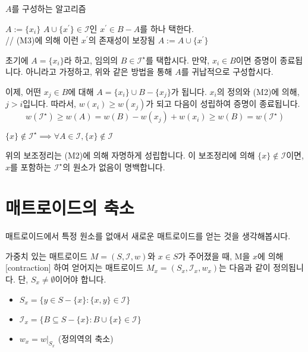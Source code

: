 \documentclass[11pt, a4paper]{book}
\newcommand{\I}{\mathcal{I}}
\begin{document}
    \begin{algorithm}
        \caption{$A$를 구성하는 알고리즘}
        \begin{algorithmic}
            \STATE $A := \{x_i\}$
                \STATE  $A \cup \{x^\prime\} \in \I$인 $x^\prime \in B - A$를 하나 택한다.\\// (M3)에 의해 이런 $x^\prime$의 존재성이 보장됨
                \STATE $A := A \cup \{ x^\prime\}$
            \ENDWHILE
        \end{algorithmic}
    \end{algorithm}
    \begin{MLPrf}
        초기에 $A = \{x_i\}$라 하고, 임의의 $B \in \I^\star$를 택합시다. 만약, $x_i \in B$이면 증명이 종료됩니다. 아니라고 가정하고, 위와 같은 방법을 통해 $A$를 귀납적으로 구성합시다.
        
        이제, 어떤 $x_j \in B$에 대해 $A = \{x_i\} \cup B - \{x_j\}$가 됩니다. $x_i$의 정의와 (M2)에 의해, $j > i$입니다. 따라서, $w(x_i) \ge w(x_j)$가 되고 다음이 성립하여 증명이 종료됩니다.
        $$ w(\I^\star) \ge w(A) = w(B) - w(x_j) + w(x_i) \ge w(B) = w(\I^\star) $$
    \end{MLPrf}
    
    \begin{MLLem}
        $\{x\} \not\in \I^\star \implies \forall A \in \I, \{x\} \not\in \I$
    \end{MLLem}
    
    위의 보조정리는 (M2)에 의해 자명하게 성립합니다. 이 보조정리에 의해 $\{x\} \not\in \I$이면, $x$를 포함하는 $\I^\star$의 원소가 없음이 명백합니다.
    
    \section{매트로이드의 축소}
    
    매트로이드에서 특정 원소를 없애서 새로운 매트로이드를 얻는 것을 생각해봅시다.
    
    \begin{MLDef}
        가중치 있는 매트로이드 $M = (S, \I, w)$와 $x \in S$가 주어졌을 때, M을 $x$에 의해 [contraction] 하여 얻어지는 매트로이드 $M_x = (S_x, \I_x, w_x)$는 다음과 같이 정의됩니다. 단, $S_x \neq \emptyset$이어야 합니다.
        \begin{itemize}
            \item $S_x = \{ y \in S - \{x\} : \{x, y\} \in \I \}$
            \item $\I_x = \{ B \subseteq S - \{x\} : B \cup \{x\} \in \I \}$
            \item $w_x = w|_{S_x}$ (정의역의 축소)
        \end{itemize}
    \end{MLDef}
    
\end{document}
